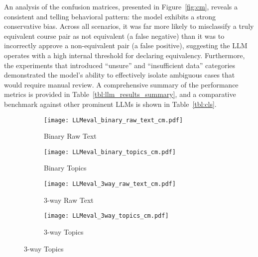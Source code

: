 An analysis of the confusion matrices, presented in Figure~\ref{fig:cm}, reveals a consistent and telling behavioral pattern: the model exhibits a strong conservative bias. Across all scenarios, it was far more likely to misclassify a truly equivalent course pair as not equivalent (a false negative) than it was to incorrectly approve a non-equivalent pair (a false positive), suggesting the LLM operates with a high internal threshold for declaring equivalency. Furthermore, the experiments that introduced ``unsure'' and ``insufficient data'' categories demonstrated the model's ability to effectively isolate ambiguous cases that would require manual review. A comprehensive summary of the performance metrics is provided in Table~\ref{tbl:llm_results_summary}, and a comparative benchmark against other prominent LLMs is shown in Table~\ref{tbl:cls}.
\begin{figure}[tb]
    \captionsetup{skip=5pt}
    \centering
    \begin{subfigure}[b]{0.497\textwidth}
        \centering
        \texttt{[image: LLMeval\_binary\_raw\_text\_cm.pdf]}
        \caption{Binary Raw Text}
        \label{fig:sub_braw}
    \end{subfigure}
    \hfill
    \begin{subfigure}[b]{0.497\textwidth}
        \centering
        \texttt{[image: LLMeval\_binary\_topics\_cm.pdf]}
        \caption{Binary Topics}
        \label{fig:sub_btopics}
    \end{subfigure}

    \vspace{2mm}

    \begin{subfigure}[b]{0.497\textwidth}
        \centering
        \texttt{[image: LLMeval\_3way\_raw\_text\_cm.pdf]}
        \caption{3-way Raw Text}
        \label{fig:sub_br3w}
    \end{subfigure}
    \hfill
    \begin{subfigure}[b]{0.497\textwidth}
        \centering
        \texttt{[image: LLMeval\_3way\_topics\_cm.pdf]}
        \caption{3-way Topics}
        \label{fig:sub_bt3w}
    \end{subfigure}

    \vspace{2mm}


\end{figure}
